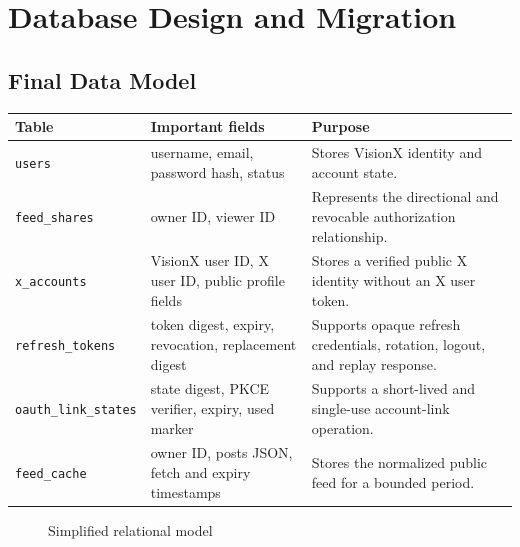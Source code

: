 \documentclass[11pt,a4paper]{report}
\newcommand{\code}[1]{\texttt{#1}}
\begin{document}
\chapter{Database Design and Migration}

\section{Final Data Model}
\begin{longtable}{L{0.22\textwidth} L{0.30\textwidth} L{0.40\textwidth}}
\toprule
\textbf{Table} & \textbf{Important fields} & \textbf{Purpose} \\
\midrule
\endhead
\code{users} & username, email, password hash, status & Stores VisionX
identity and account state. \\
\code{feed\_shares} & owner ID, viewer ID & Represents the directional and
revocable authorization relationship. \\
\code{x\_accounts} & VisionX user ID, X user ID, public profile fields &
Stores a verified public X identity without an X user token. \\
\code{refresh\_tokens} & token digest, expiry, revocation, replacement digest
& Supports opaque refresh credentials, rotation, logout, and replay response. \\
\code{oauth\_link\_states} & state digest, PKCE verifier, expiry, used marker &
Supports a short-lived and single-use account-link operation. \\
\code{feed\_cache} & owner ID, posts JSON, fetch and expiry timestamps & Stores
the normalized public feed for a bounded period. \\
\bottomrule
\end{longtable}

\begin{figure}[htbp]
\centering
{}
\caption{Simplified relational model}
\label{fig:data-model}
\end{figure}
\end{document}
